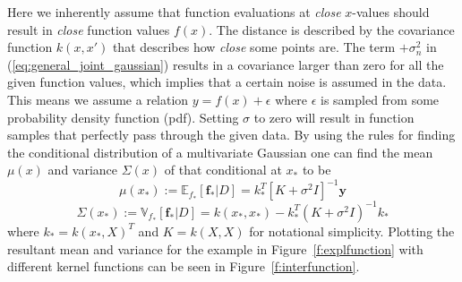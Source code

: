     Here we inherently assume that function evaluations at \textit{close} $x$-values should result in \textit{close} function values $f(x)$. The distance is described by the covariance function $k(x,x')$ that describes how \textit{close} some points are. The term $+\sigma_{n}^{2}$ in (\ref{eq:general_joint_gaussian}) results in a covariance larger than zero for all the given function values, which implies that a certain noise is assumed in the data. This means we assume a relation $y = f(x) +\epsilon$ where $\epsilon$ is sampled from some probability density function (pdf). Setting $\sigma$ to zero will result in function samples that perfectly pass through the given data. By using the rules for finding the conditional distribution of a multivariate Gaussian one can find the mean $\mu (x)$ and variance $\Sigma(x)$ of that conditional at $x_*$ to be
    \begin{equation}
        \label{eq:GPmean}
        \mu(x_*) := 
        \mathbb{E}_{f_*}\left[\mathbf{f}_{*}|D\right] = 
        k_*^T[K+\sigma ^{2} I]^{-1} \mathbf{y}
    \end{equation}
    \begin{equation}
        \label{eq:GPvariance}
        \Sigma(x_*):=
        \mathbb{V}_{f_*}\left[\mathbf{f}_{*}|D\right] =
        k\left(x_{*}, x_{*}\right)-k_*^T\left(K+\sigma ^{2} I\right)^{-1} k_*
    \end{equation}
    where $k_* = k(x_*,X)^T$ and $K = k(X,X)$ for notational simplicity. Plotting the resultant mean and variance for the example in Figure~\ref{f:explfunction} with different kernel functions can be seen in Figure~\ref{f:interfunction}.
